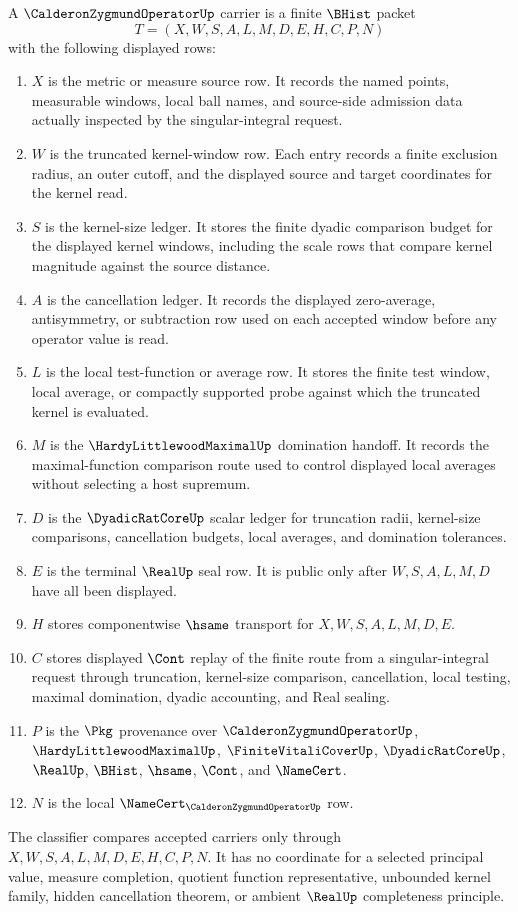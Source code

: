 \begin{definition}
\label{def:calderon-zygmund-operator-carrier}
A $\CalderonZygmundOperatorUp$ carrier is a finite $\BHist$ packet
$$
T=(X,W,S,A,L,M,D,E,H,C,P,N)
$$
with the following displayed rows:
\begin{enumerate}
\item $X$ is the metric or measure source row. It records the named points, measurable windows, local ball names, and source-side admission data actually inspected by the singular-integral request.
\item $W$ is the truncated kernel-window row. Each entry records a finite exclusion radius, an outer cutoff, and the displayed source and target coordinates for the kernel read.
\item $S$ is the kernel-size ledger. It stores the finite dyadic comparison budget for the displayed kernel windows, including the scale rows that compare kernel magnitude against the source distance.
\item $A$ is the cancellation ledger. It records the displayed zero-average, antisymmetry, or subtraction row used on each accepted window before any operator value is read.
\item $L$ is the local test-function or average row. It stores the finite test window, local average, or compactly supported probe against which the truncated kernel is evaluated.
\item $M$ is the $\HardyLittlewoodMaximalUp$ domination handoff. It records the maximal-function comparison route used to control displayed local averages without selecting a host supremum.
\item $D$ is the $\DyadicRatCoreUp$ scalar ledger for truncation radii, kernel-size comparisons, cancellation budgets, local averages, and domination tolerances.
\item $E$ is the terminal $\RealUp$ seal row. It is public only after $W,S,A,L,M,D$ have all been displayed.
\item $H$ stores componentwise $\hsame$ transport for $X,W,S,A,L,M,D,E$.
\item $C$ stores displayed $\Cont$ replay of the finite route from a singular-integral request through truncation, kernel-size comparison, cancellation, local testing, maximal domination, dyadic accounting, and Real sealing.
\item $P$ is the $\Pkg$ provenance over $\CalderonZygmundOperatorUp$, $\HardyLittlewoodMaximalUp$, $\FiniteVitaliCoverUp$, $\DyadicRatCoreUp$, $\RealUp$, $\BHist$, $\hsame$, $\Cont$, and $\NameCert$.
\item $N$ is the local $\NameCert_{\CalderonZygmundOperatorUp}$ row.
\end{enumerate}
The classifier compares accepted carriers only through $X,W,S,A,L,M,D,E,H,C,P,N$. It has no coordinate for a selected principal value, measure completion, quotient function representative, unbounded kernel family, hidden cancellation theorem, or ambient $\RealUp$ completeness principle.
\end{definition}

